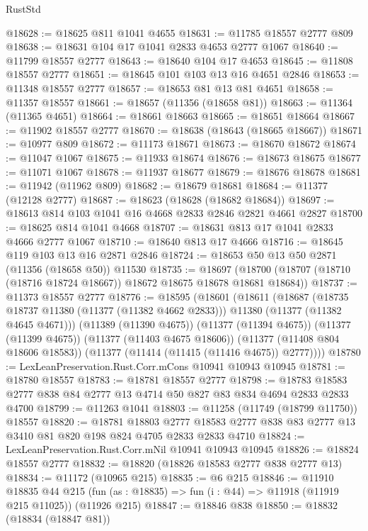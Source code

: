 \begin{lexlean}{RustStd}
\begin{coremodule}
@18628 := @18625 @811 @1041 @4655
@18631 := @11785 @18557 @2777 @809
@18638 := @18631 @104 @17 @1041 @2833 @4653 @2777 @1067
@18640 := @11799 @18557 @2777
@18643 := @18640 @104 @17 @4653
@18645 := @11808 @18557 @2777
@18651 := @18645 @101 @103 @13 @16 @4651 @2846
@18653 := @11348 @18557 @2777
@18657 := @18653 @81 @13 @81 @4651
@18658 := @11357 @18557
@18661 := @18657 (@11356 (@18658 @81))
@18663 := @11364 (@11365 @4651)
@18664 := @18661 @18663
@18665 := @18651 @18664
@18667 := @11902 @18557 @2777
@18670 := @18638 (@18643 (@18665 @18667))
@18671 := @10977 @809
@18672 := @11173 @18671
@18673 := @18670 @18672
@18674 := @11047 @1067
@18675 := @11933 @18674
@18676 := @18673 @18675
@18677 := @11071 @1067
@18678 := @11937 @18677
@18679 := @18676 @18678
@18681 := @11942 (@11962 @809)
@18682 := @18679 @18681
@18684 := @11377 (@12128 @2777)
@18687 := @18623 (@18628 (@18682 @18684))
@18697 := @18613 @814 @103 @1041 @16 @4668 @2833 @2846 @2821 @4661 @2827
@18700 := @18625 @814 @1041 @4668
@18707 := @18631 @813 @17 @1041 @2833 @4666 @2777 @1067
@18710 := @18640 @813 @17 @4666
@18716 := @18645 @119 @103 @13 @16 @2871 @2846
@18724 := @18653 @50 @13 @50 @2871 (@11356 (@18658 @50)) @11530
@18735 := @18697
    (@18700 (@18707 (@18710 (@18716 @18724 @18667)) @18672 @18675 @18678 @18681 @18684))
@18737 := @11373 @18557 @2777
@18776 := @18595
    (@18601
      (@18611
        (@18687
          (@18735 @18737 @11380 (@11377 (@11382 @4662 @2833)))
          @11380
          (@11377 (@11382 @4645 @4671)))
        (@11389 (@11390 @4675))
        (@11377 (@11394 @4675))
        (@11377 (@11399 @4675))
        (@11377 (@11403 @4675 @18606))
        (@11377 (@11408 @804 @18606 @18583))
        (@11377 (@11414 (@11415 (@11416 @4675)) @2777))))
@18780 := LexLeanPreservation.Rust.Corr.mCons @10941 @10943 @10945
@18781 := @18780 @18557
@18783 := @18781 @18557 @2777
@18798 := @18783 @18583 @2777 @838 @84 @2777 @13 @4714 @50 @827 @83 @834 @4694 @2833 @2833 @4700
@18799 := @11263 @1041
@18803 := @11258 (@11749 (@18799 @11750)) @18557
@18820 := @18781
    @18803
    @2777
    @18583
    @2777
    @838
    @83
    @2777
    @13
    @3410
    @81
    @820
    @198
    @824
    @4705
    @2833
    @2833
    @4710
@18824 := LexLeanPreservation.Rust.Corr.mNil @10941 @10943 @10945
@18826 := @18824 @18557 @2777
@18832 := @18820 (@18826 @18583 @2777 @838 @2777 @13)
@18834 := @11172 (@10965 @215)
@18835 := @6 @215
@18846 := @11910
    @18835
    @44
    @215
    (fun (as : @18835) => fun (i : @44) => @11918 (@11919 @215 @11025))
    (@11926 @215)
@18847 := @18846 @838
@18850 := @18832 (@18834 (@18847 @81))

\end{coremodule}
\end{lexlean}
